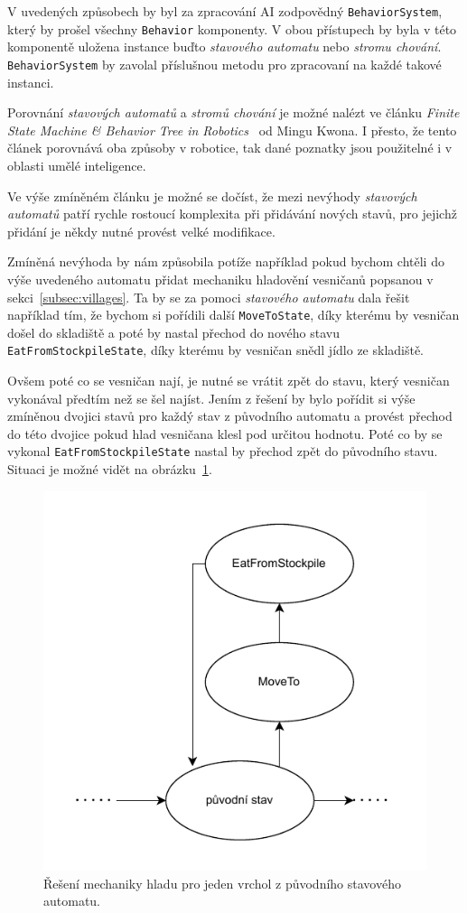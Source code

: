 V uvedených způsobech by byl za zpracování AI zodpovědný \texttt{BehaviorSystem}, který by prošel všechny \texttt{Behavior} komponenty. V obou přístupech by byla v této komponentě uložena instance buďto \textit{stavového automatu} nebo \textit{stromu chování}. \texttt{BehaviorSystem} by zavolal příslušnou metodu pro zpracovaní na každé takové instanci.


Porovnání \textit{stavových automatů} a \textit{stromů chování} je možné nalézt ve článku \textit{Finite State Machine \& Behavior Tree in Robotics}~\cite{FMTAndBTInRobotics} od Mingu Kwona. I přesto, že tento článek porovnává oba způsoby v robotice, tak dané poznatky jsou použitelné i v oblasti umělé inteligence.

Ve výše zmíněném článku je možné se dočíst, že mezi nevýhody \textit{stavových automatů} patří rychle rostoucí komplexita při přidávání nových stavů, pro jejichž přidání je někdy nutné provést velké modifikace.

Zmíněná nevýhoda by nám způsobila potíže například pokud bychom chtěli do výše uvedeného automatu přidat mechaniku hladovění vesničanů popsanou v sekci~\ref{subsec:villages}. Ta by se za pomoci \textit{stavového automatu} dala řešit například tím, že bychom si pořídili další \texttt{MoveToState}, díky kterému by vesničan došel do skladiště a poté by nastal přechod do nového stavu \texttt{EatFromStockpileState}, díky kterému by vesničan snědl jídlo ze skladiště. 

Ovšem poté co se vesničan nají, je nutné se vrátit zpět do stavu, který vesničan vykonával předtím než se šel najíst. Jením z řešení by bylo pořídit si výše zmíněnou dvojici stavů pro každý stav z původního automatu a provést přechod do této dvojice pokud hlad vesničana klesl pod určitou hodnotu. Poté co by se vykonal \texttt{EatFromStockpileState} nastal by přechod zpět do původního stavu. Situaci je možné vidět na obrázku~\ref{fig:transition}.

\begin{figure}[!htb]
    \centering
    \includegraphics[width=0.6\linewidth]{img/transition.pdf}
    \caption{Řešení mechaniky hladu pro jeden vrchol z původního stavového automatu.}
    \label{fig:transition}
\end{figure}

